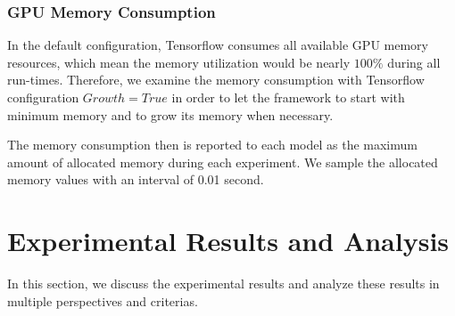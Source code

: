 \documentclass[conference]{IEEEtran}
\begin{document}
\subsubsection{GPU Memory Consumption}
In the default configuration, Tensorflow consumes all available GPU memory resources, which mean the memory utilization would be nearly $100\%$ during all run-times. Therefore, we examine the memory consumption with Tensorflow configuration $Growth = True$ in order to let the framework to start with minimum memory and to grow its memory when necessary. 

The memory consumption then is reported to each model as the maximum amount of allocated memory during each experiment. We sample the allocated memory values with an interval of 0.01 second.


\section{Experimental Results and Analysis}


In this section, we discuss the experimental results and analyze these results in multiple perspectives and criterias.
\end{document}
